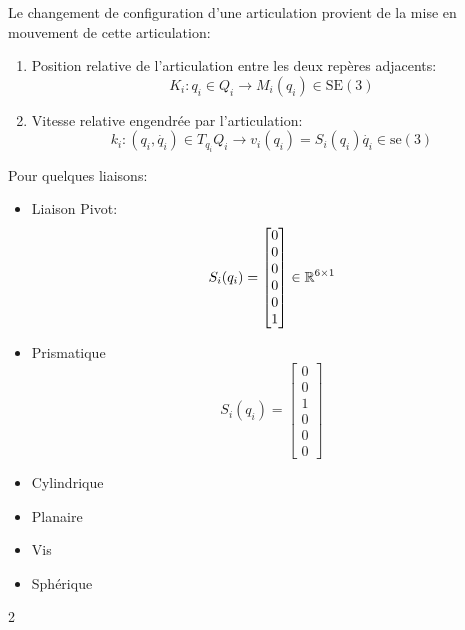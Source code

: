 \documentclass[math]{cours}
\begin{document}
\begin{definition}
	Le changement de configuration d'une articulation provient de la mise en mouvement de cette articulation:
	\begin{enumerate}
		\item Position relative de l'articulation entre les deux repères adjacents:
			\begin{equation*}
				K_{i}: q_{i} \in Q_{i} \to M_{i}(q_{i}) \in \mathrm{SE}(3)
			\end{equation*}
		\item Vitesse relative engendrée par l'articulation:
			\begin{equation*}
				k_{i}: (q_{i}, \dot{q_{i}}) \in T_{q_{i}}Q_{i} \to v_{i}(q_{i}) = S_{i}(q_{i})\dot{q_{i}} \in \mathrm{se(3)}
			\end{equation*}
	\end{enumerate}
	Pour quelques liaisons:
	\begin{multicols}{2}
	\begin{itemize}
		\item Liaison Pivot:
			\begin{equation*}
				S_{i}(q_{i}) = \begin{bmatrix}
					0 \\ 0 \\ 0 \\ 0 \\ 0 \\ 1
				\end{bmatrix}\in \mathbb{R}^{6 \times 1}
			\end{equation*}
		\item Prismatique \begin{equation*}
			      S_{i}(q_{i}) = \begin{bmatrix}
				      0 \\ 0\\ 1\\ 0\\ 0\\ 0
			      \end{bmatrix}
		      \end{equation*}
		\item Cylindrique
		\item Planaire
		\item Vis
		\item Sphérique
	\end{itemize}
	\end{multicols}{2}
	\label{def:vitessearticulaire}
\end{definition}
\end{document}
